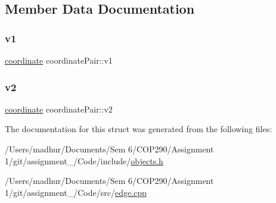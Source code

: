 \subsection{Member Data Documentation}
\mbox{\label{structcoordinate_pair_ad20aa480a259a5ba0c670665c83371e2}} 
\subsubsection{\texorpdfstring{v1}{v1}}
{\footnotesize\ttfamily \mbox{\hyperlink{structcoordinate}{coordinate}} coordinate\+Pair\+::v1}

\mbox{\label{structcoordinate_pair_a204dda11b9a29fd8d5967987253064b2}} 
\subsubsection{\texorpdfstring{v2}{v2}}
{\footnotesize\ttfamily \mbox{\hyperlink{structcoordinate}{coordinate}} coordinate\+Pair\+::v2}



The documentation for this struct was generated from the following files\+:\begin{DoxyCompactItemize}
\item 
/\+Users/madhur/\+Documents/\+Sem 6/\+C\+O\+P290/\+Assignment 1/git/assignment\+\_/\+Code/include/\mbox{\hyperlink{objects_8h}{objects.\+h}}\item 
/\+Users/madhur/\+Documents/\+Sem 6/\+C\+O\+P290/\+Assignment 1/git/assignment\+\_/\+Code/src/\mbox{\hyperlink{edge_8cpp}{edge.\+cpp}}\end{DoxyCompactItemize}
